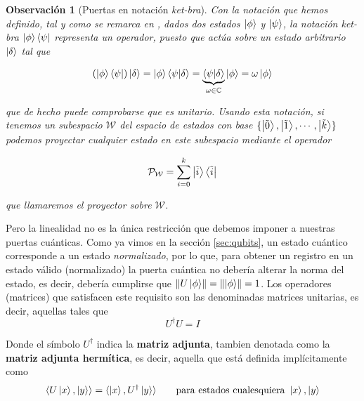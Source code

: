 \documentclass[11pt, spanish]{report}
\numberwithin{equation}{section}
\newtheorem{obs}[defin]{Observación}
\numberwithin{defin}{section}
\begin{document}
\begin{obs}[Puertas en notación \textit{ket-bra}]\label{holaOperador} Con la notación que hemos definido, tal y como se remarca en \cite{feynman1965lectures}, dados dos estados $\ket{\phi}$ y $\ket{\psi}$, la notación \textit{ket-bra} $\ket{\phi}\bra{\psi}$ representa un operador, puesto que actúa sobre un estado arbitrario $\ket{\delta}$ tal que

\begin{equation}
(\ket{\phi}\bra{\psi})\ket{\delta}=\ket{\phi}\bra{\psi}\ket{\delta}=\underbrace{\bra{\psi}\ket{\delta}}_{\omega\in\mathbb{C}}\ket{\phi}=\omega\ket{\phi}
\end{equation}

\noindent que de hecho puede comprobarse que es unitario. Usando esta notación, si tenemos un subespacio $\mathcal{W}$ del espacio de estados con base $\{\ket{\tilde{0}}, \ket{\tilde{1}},\cdots,\ket{\tilde{k}}\}$ podemos proyectar cualquier estado en este subespacio mediante el operador

\begin{equation}
\mathcal{P}_\mathcal{W}=\sum_{i=0}^k\ket{\tilde{i}}\bra{\tilde{i}}
\end{equation}

\noindent que llamaremos el \textit{proyector} sobre $\mathcal{W}$.
\end{obs}

Pero la linealidad no es la única restricción que debemos imponer a nuestras puertas cuánticas. Como ya vimos en la sección \ref{sec:qubits}, un estado cuántico corresponde a un estado \emph{normalizado}, por lo que, para obtener un registro en un estado válido (normalizado) la puerta cuántica no debería alterar la norma del estado, es decir, debería cumplirse que $\norm{U\ket{\phi}}=\norm{\ket{\phi}}=1$. Los operadores (matrices) que satisfacen este requisito son las denominadas matrices unitarias, es decir, aquellas tales que 
\begin{equation}
U^{\dag}U=I
\end{equation}

Donde el símbolo $U^\dag$ indica la \textbf{matriz adjunta}, tambien denotada como la \textbf{matriz adjunta hermítica}, es decir, aquella que está definida implícitamente como 
\begin{equation}
\langle U\ket{x}, \ket{y} \rangle=\langle \ket{x}, U^\dag\ket{y} \rangle\qquad \text{para estados cualesquiera }\ket{x},\ket{y}
\end{equation}
\end{document}
